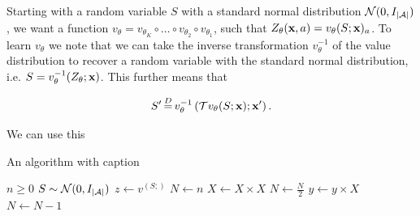 \documentclass[twoside]{article}
\begin{document}

Starting with a random variable \(S\) with a standard normal distribution
\(\mathcal{N}(0, I_{\lvert \mathcal{A} \rvert})\), we want a function \(v_\theta = v_{\theta_K}
\circ \dots \circ v_{\theta_2} \circ v_{\theta_1} \), such that
\(Z_\theta(\textbf{x}, a) = v_\theta(S; \textbf{x})_a\). To learn \(v_\theta\) we note that
we can take the inverse transformation \(v^{-1}_\theta\) of the value
distribution to recover a random variable with the standard normal distribution,
i.e. \(S = v^{-1}_\theta(Z_\theta; \textbf{x})\). This further means that

\begin{equation}
  S^\prime \eqdist v^{-1}_\theta \left(\T v_\theta(S; \rvx); \rvx^\prime \right).
\end{equation}

We can use this

\begin{algorithm}
  \caption{An algorithm with caption}\label{alg:cap}
  \begin{algorithmic}
  \Require $n \geq 0$
  \EndInput
  \State $S \sim \mathcal{N}(0,I_{\lvert \mathcal{A} \rvert})$
  \State $z \gets v^(S; )$
  \State $N \gets n$
      \State $X \gets X \times X$
      \State $N \gets \frac{N}{2}$  
      \State $y \gets y \times X$
      \State $N \gets N - 1$
  \EndIf
  \EndWhile
  \end{algorithmic}
\end{algorithm}



\end{document}
